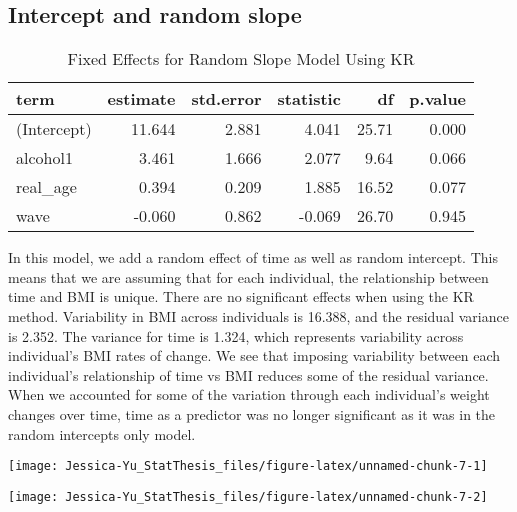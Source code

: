 \documentclass[12pt, twoside]{amherstthesis}
\begin{document}
\hypertarget{intercept-and-random-slope}{%
\subsection{Intercept and random slope}\label{intercept-and-random-slope}}
\begin{table}[H]

\caption{\label{tab:slopekr}Fixed Effects for Random Slope Model Using KR}
\centering
\begin{tabular}[t]{l|r|r|r|r|r}
\hline
term & estimate & std.error & statistic & df & p.value\\
\hline
(Intercept) & 11.644 & 2.881 & 4.041 & 25.71 & 0.000\\
\hline
alcohol1 & 3.461 & 1.666 & 2.077 & 9.64 & 0.066\\
\hline
real\_age & 0.394 & 0.209 & 1.885 & 16.52 & 0.077\\
\hline
wave & -0.060 & 0.862 & -0.069 & 26.70 & 0.945\\
\hline
\end{tabular}
\end{table}
In this model, we add a random effect of time as well as random intercept. This means that we are assuming that for each individual, the relationship between time and BMI is unique. There are no significant effects when using the KR method. Variability in BMI across individuals is 16.388, and the residual variance is 2.352. The variance for time is 1.324, which represents variability across individual's BMI rates of change. We see that imposing variability between each individual's relationship of time vs BMI reduces some of the residual variance. When we accounted for some of the variation through each individual's weight changes over time, time as a predictor was no longer significant as it was in the random intercepts only model.
\begin{center}\texttt{[image: Jessica-Yu\_StatThesis\_files/figure-latex/unnamed-chunk-7-1]} \end{center}
\begin{center}\texttt{[image: Jessica-Yu\_StatThesis\_files/figure-latex/unnamed-chunk-7-2]} \end{center}
\end{document}
